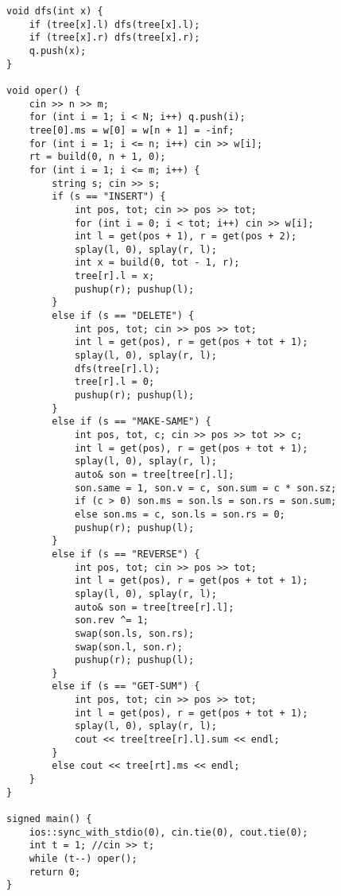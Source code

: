 \begin{lstlisting}
void dfs(int x) {
	if (tree[x].l) dfs(tree[x].l);
	if (tree[x].r) dfs(tree[x].r);
	q.push(x);
}

void oper() {
	cin >> n >> m;
	for (int i = 1; i < N; i++) q.push(i);
	tree[0].ms = w[0] = w[n + 1] = -inf;
	for (int i = 1; i <= n; i++) cin >> w[i];
	rt = build(0, n + 1, 0);
	for (int i = 1; i <= m; i++) {
		string s; cin >> s;
		if (s == "INSERT") {
			int pos, tot; cin >> pos >> tot;
			for (int i = 0; i < tot; i++) cin >> w[i];
			int l = get(pos + 1), r = get(pos + 2);
			splay(l, 0), splay(r, l);
			int x = build(0, tot - 1, r);
			tree[r].l = x;
			pushup(r); pushup(l);
		}
		else if (s == "DELETE") {
			int pos, tot; cin >> pos >> tot;
			int l = get(pos), r = get(pos + tot + 1);
			splay(l, 0), splay(r, l);
			dfs(tree[r].l);
			tree[r].l = 0;
			pushup(r); pushup(l);
		}
		else if (s == "MAKE-SAME") {
			int pos, tot, c; cin >> pos >> tot >> c;
			int l = get(pos), r = get(pos + tot + 1);
			splay(l, 0), splay(r, l);
			auto& son = tree[tree[r].l];
			son.same = 1, son.v = c, son.sum = c * son.sz;
			if (c > 0) son.ms = son.ls = son.rs = son.sum;
			else son.ms = c, son.ls = son.rs = 0;
			pushup(r); pushup(l);
		}
		else if (s == "REVERSE") {
			int pos, tot; cin >> pos >> tot;
			int l = get(pos), r = get(pos + tot + 1);
			splay(l, 0), splay(r, l);
			auto& son = tree[tree[r].l];
			son.rev ^= 1;
			swap(son.ls, son.rs);
			swap(son.l, son.r);
			pushup(r); pushup(l);
		}
		else if (s == "GET-SUM") {
			int pos, tot; cin >> pos >> tot;
			int l = get(pos), r = get(pos + tot + 1);
			splay(l, 0), splay(r, l);
			cout << tree[tree[r].l].sum << endl;
		}
		else cout << tree[rt].ms << endl;
	}
}

signed main() {
	ios::sync_with_stdio(0), cin.tie(0), cout.tie(0);
	int t = 1; //cin >> t;
	while (t--) oper();
	return 0;
}
\end{lstlisting}

